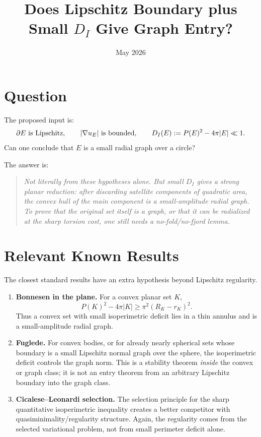 \documentclass[11pt]{article}
\title{Does Lipschitz Boundary plus Small \(D_I\) Give Graph Entry?}
\author{}
\date{May 2026}
\newcommand{\DI}{D_I}
\begin{document}
\maketitle

\section{Question}

The proposed input is:
\[
   \partial E\hbox{ is Lipschitz},\qquad
   |\nabla u_E|\hbox{ is bounded},\qquad
   \DI(E):=P(E)^2-4\pi |E|\ll1 .
\]
Can one conclude that \(E\) is a small radial graph over a circle?

The answer is:

\begin{quote}
\emph{Not literally from these hypotheses alone.  But small \(D_I\) gives a
strong planar reduction: after discarding satellite components of
quadratic area, the convex hull of the main component is a small-amplitude
radial graph.  To prove that the original set itself is a graph, or that it
can be radialized at the sharp torsion cost, one still needs a no-fold/no-fjord
lemma.}
\end{quote}

\section{Relevant Known Results}

The closest standard results have an extra hypothesis beyond Lipschitz
regularity.

\begin{enumerate}[label=\arabic*.]
\item \textbf{Bonnesen in the plane.}  For a convex planar set \(K\),
\[
   P(K)^2-4\pi |K|\ge \pi^2(R_K-r_K)^2.
\]
Thus a convex set with small isoperimetric deficit lies in a thin annulus and
is a small-amplitude radial graph.

\item \textbf{Fuglede.}  For convex bodies, or for already nearly spherical
sets whose boundary is a small Lipschitz normal graph over the sphere, the
isoperimetric deficit controls the graph norm.  This is a stability theorem
\emph{inside} the convex or graph class; it is not an entry theorem from an
arbitrary Lipschitz boundary into the graph class.

\item \textbf{Cicalese--Leonardi selection.}  The selection principle for the
sharp quantitative isoperimetric inequality creates a better competitor with
quasiminimality/regularity structure.  Again, the regularity comes from the
selected variational problem, not from small perimeter deficit alone.
\end{enumerate}
\end{document}
